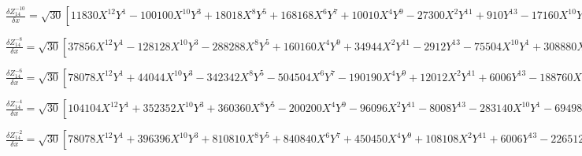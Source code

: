 \documentclass[10pt,landscape]{article}
\begin{document}
\vspace{1.2 mm}
\noindent $ \frac{\delta Z^{-10}_{14}}{\delta x} = \sqrt{30} [11830X^{12}Y^{1} -100100X^{10}Y^{3} +18018X^{8}Y^{5} +168168X^{6}Y^{7} +10010X^{4}Y^{9} -27300X^{2}Y^{11} +910Y^{13} -17160X^{10}Y^{1} +154440X^{8}Y^{3} -144144X^{6}Y^{5} -102960X^{4}Y^{7} +51480X^{2}Y^{9} -1560Y^{11} +5940X^{8}Y^{1} -55440X^{6}Y^{3} +83160X^{4}Y^{5} -23760X^{2}Y^{7} +660Y^{9}] $

\vspace{1.2 mm}
\noindent $ \frac{\delta Z^{-8}_{14}}{\delta x} = \sqrt{30} [37856X^{12}Y^{1} -128128X^{10}Y^{3} -288288X^{8}Y^{5} +160160X^{4}Y^{9} +34944X^{2}Y^{11} -2912Y^{13} -75504X^{10}Y^{1} +308880X^{8}Y^{3} +288288X^{6}Y^{5} -205920X^{4}Y^{7} -102960X^{2}Y^{9} +6864Y^{11} +47520X^{8}Y^{1} -221760X^{6}Y^{3} +95040X^{2}Y^{7} -5280Y^{9} -9240X^{6}Y^{1} +46200X^{4}Y^{3} -27720X^{2}Y^{5} +1320Y^{7}] $

\vspace{1.2 mm}
\noindent $ \frac{\delta Z^{-6}_{14}}{\delta x} = \sqrt{30} [78078X^{12}Y^{1} +44044X^{10}Y^{3} -342342X^{8}Y^{5} -504504X^{6}Y^{7} -190190X^{4}Y^{9} +12012X^{2}Y^{11} +6006Y^{13} -188760X^{10}Y^{1} +51480X^{8}Y^{3} +720720X^{6}Y^{5} +514800X^{4}Y^{7} +17160X^{2}Y^{9} -17160Y^{11} +160380X^{8}Y^{1} -166320X^{6}Y^{3} -415800X^{4}Y^{5} -71280X^{2}Y^{7} +17820Y^{9} -55440X^{6}Y^{1} +92400X^{4}Y^{3} +55440X^{2}Y^{5} -7920Y^{7} +6300X^{4}Y^{1} -12600X^{2}Y^{3} +1260Y^{5}] $

\vspace{1.2 mm}
\noindent $ \frac{\delta Z^{-4}_{14}}{\delta x} = \sqrt{30} [104104X^{12}Y^{1} +352352X^{10}Y^{3} +360360X^{8}Y^{5} -200200X^{4}Y^{9} -96096X^{2}Y^{11} -8008Y^{13} -283140X^{10}Y^{1} -694980X^{8}Y^{3} -360360X^{6}Y^{5} +257400X^{4}Y^{7} +231660X^{2}Y^{9} +25740Y^{11} +285120X^{8}Y^{1} +443520X^{6}Y^{3} -190080X^{2}Y^{7} -31680Y^{9} -129360X^{6}Y^{1} -92400X^{4}Y^{3} +55440X^{2}Y^{5} +18480Y^{7} +25200X^{4}Y^{1} -5040Y^{5} -1512X^{2}Y^{1} +504Y^{3}] $

\vspace{1.2 mm}
\noindent $ \frac{\delta Z^{-2}_{14}}{\delta x} = \sqrt{30} [78078X^{12}Y^{1} +396396X^{10}Y^{3} +810810X^{8}Y^{5} +840840X^{6}Y^{7} +450450X^{4}Y^{9} +108108X^{2}Y^{11} +6006Y^{13} -226512X^{10}Y^{1} -926640X^{8}Y^{3} -1441440X^{6}Y^{5} -1029600X^{4}Y^{7} -308880X^{2}Y^{9} -20592Y^{11} +249480X^{8}Y^{1} +776160X^{6}Y^{3} +831600X^{4}Y^{5} +332640X^{2}Y^{7} +27720Y^{9} -129360X^{6}Y^{1} -277200X^{4}Y^{3} -166320X^{2}Y^{5} -18480Y^{7} +31500X^{4}Y^{1} +37800X^{2}Y^{3} +6300Y^{5} -3024X^{2}Y^{1} -1008Y^{3} +56Y^{1}] $
\end{document}
